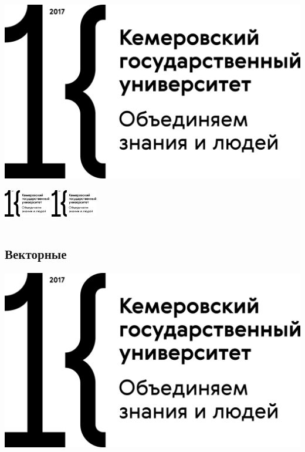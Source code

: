 \documentclass[russian]{beamer}
\begin{document}
\begin{frame}
	\includegraphics[scale=0.2]{kemsu_logo}	%
	\includegraphics[width=2cm,height=2cm]{kemsu_logo} %
	\includegraphics[width=2cm,height=2cm,keepaspectratio]{kemsu_logo} %
\end{frame}

\subsection{Векторные}

\begin{frame}
	\includegraphics[scale=0.2]{logo}
\end{frame}
\end{document}
